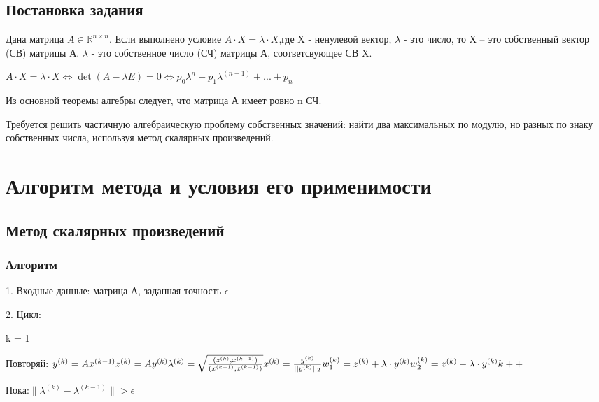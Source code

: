 \documentclass{article}
\begin{document}
	\subsection{Постановка задания}
	Дана матрица $A \in \mathbb{R}^{n \times n}$. Если выполнено условие $A \cdot X = \lambda \cdot X$,где X - ненулевой вектор, $\lambda$ - это  число, то Х – это собственный вектор (СВ) матрицы А. $\lambda$ - это собственное число (СЧ) матрицы А, соответсвующее СВ X.
	
	$A \cdot X = \lambda \cdot X \Leftrightarrow \det(A-\lambda E) = 0 \Leftrightarrow p_0\lambda^n + p_1\lambda^{(n-1)}+...+p_n$
	
	Из основной теоремы алгебры следует, что матрица А имеет ровно n СЧ.
	
	Требуется решить частичную алгебраическую проблему собственных значений: найти два максимальных по модулю, но разных по знаку собственных числа, используя метод скалярных произведений.
\newpage
	
		\section{Алгоритм метода и условия его применимости}   
	
	\subsection{Метод скалярных произведений}
	\subsubsection{Алгоритм}
	1. Входные данные: матрица А, заданная точность $\epsilon$
	
	2. Цикл:
	
	k = 1
	
	Повторяй:
	$
	~\\
	y^{(k)} = Ax^{(k-1)}
	~\\
	z^{(k)} = A y^{(k)}
	~\\
	\lambda^{(k)} = \sqrt{\frac{(z^{(k)}, x^{(k-1)})}	{(x^{(k-1)}, x^{(k-1)})}}	
	~\\
	x^{(k)} = \frac{y^{(k)}}{||y^{(k)}||_2}
	~\\
	w^{(k)}_{1} = z^{(k)} + \lambda\cdot  y^{(k)}
	~\\
	w^{(k)}_{2} = z^{(k)} - \lambda\cdot y^{(k)}
	~\\
	k++
	~\\	
	$
	
	Пока:$\|\lambda^{(k)} - \lambda^{(k-1)}\|> \epsilon $
	
\end{document}
